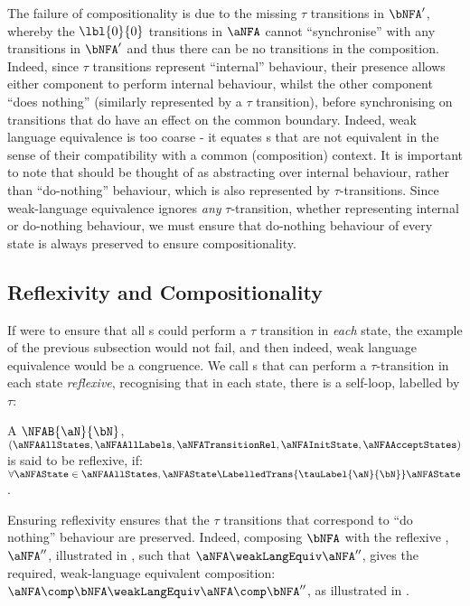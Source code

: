 The failure of compositionality is due to the missing $\tau$ transitions in
$\bNFA'$, whereby the $\lbl{0}{0}$ transitions in $\aNFA$ cannot ``synchronise''
with any transitions in $\bNFA'$ and thus there can be no transitions in the
composition. Indeed, since $\tau$ transitions represent ``internal'' behaviour,
their presence allows either component to perform internal behaviour, whilst
the other component ``does nothing'' (similarly represented by a $\tau$
transition), before synchronising on transitions that do have an effect on the
common boundary. Indeed, weak language equivalence is too coarse - it equates
\TNFA{}s that are not equivalent in the sense of their compatibility with a
common (composition) context. It is important to note that \tauClosure{} should
be thought of as abstracting over internal behaviour, rather than
``do-nothing'' behaviour, which is also represented by $\tau$-transitions.
Since weak-language equivalence ignores \emph{any} $\tau$-transition, whether
representing internal or do-nothing behaviour, we must ensure that do-nothing
behaviour of every state is always preserved to ensure compositionality.

\subsection{Reflexivity and Compositionality}

If were to ensure that all \TNFA{}s could perform a $\tau$ transition in
\emph{each} state, the example of the previous subsection would not fail, and
then indeed, weak language equivalence would be a congruence. We call \TNFA{}s that
can perform a $\tau$-transition in each state \emph{reflexive},
recognising that in each state, there is a self-loop, labelled by $\tau$:

\begin{definition}\label{defn:reflexiveTNFA}
    A $\NFAB{\aN}{\bN}$,
    $( \aNFAAllStates
     , \aNFAAllLabels
     , \aNFATransitionRel
     , \aNFAInitState
     , \aNFAAcceptStates
     )$ is said to be reflexive, if: $\forall \aNFAState \in \aNFAAllStates,
     \aNFAState \LabelledTrans{\tauLabel{\aN}{\bN}} \aNFAState$.
\end{definition}

Ensuring reflexivity ensures that the $\tau$ transitions that correspond to
``do nothing'' behaviour are preserved. Indeed, composing $\bNFA$ with the
reflexive \TNFA{}, $\aNFA''$, illustrated in
, such that $\aNFA \weakLangEquiv
\aNFA''$, gives the required, weak-language equivalent composition:
$\aNFA \comp \bNFA \weakLangEquiv \aNFA \comp \bNFA''$, as illustrated in
.

